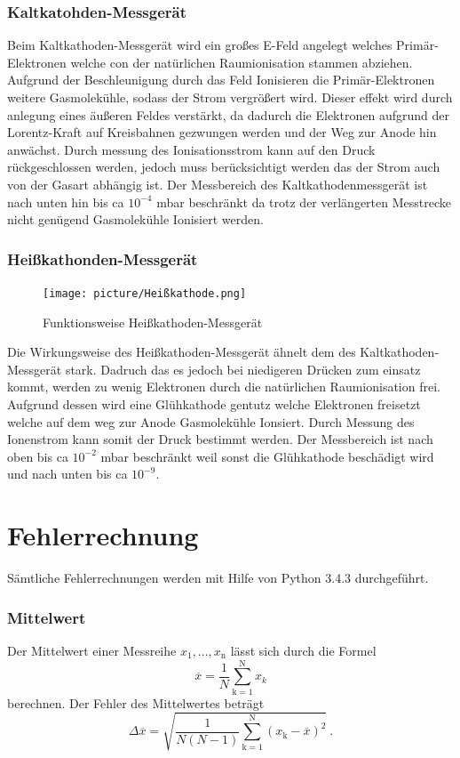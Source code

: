 \subsubsection{Kaltkatohden-Messgerät}
Beim Kaltkathoden-Messgerät wird ein großes E-Feld angelegt welches Primär-Elektronen welche con der natürlichen Raumionisation stammen abziehen. Aufgrund der Beschleunigung durch das Feld Ionisieren die Primär-Elektronen weitere Gasmolekühle, sodass der Strom vergrößert wird. Dieser effekt wird durch anlegung eines äußeren Feldes verstärkt, da dadurch die Elektronen aufgrund der Lorentz-Kraft auf Kreisbahnen gezwungen werden und der Weg zur Anode hin anwächst. Durch messung des Ionisationsstrom kann auf den Druck rückgeschlossen werden, jedoch muss berücksichtigt werden das der Strom auch von der Gasart abhängig ist. Der Messbereich des Kaltkathodenmessgerät ist nach unten hin bis ca $10^{-4}$ mbar beschränkt da trotz der verlängerten Messtrecke nicht genügend Gasmolekühle Ionisiert werden.

\subsubsection{Heißkathonden-Messgerät}
\begin{figure}
  \vspace{-1.0cm}
  \centering
  \texttt{[image: picture/Heißkathode.png]}
  \caption{Funktionsweise Heißkathoden-Messgerät \cite{Heiss}}
  \label{fig:Heißkathode}
  \vspace{-1cm}
\end{figure}
Die Wirkungsweise des Heißkathoden-Messgerät ähnelt dem des Kaltkathoden-Messgerät stark. Dadruch das es jedoch bei niedigeren Drücken zum einsatz kommt, werden zu wenig Elektronen durch die natürlichen Raumionisation frei. Aufgrund dessen wird eine Glühkathode gentutz welche Elektronen freisetzt welche auf dem weg zur Anode Gasmolekühle Ionsiert. Durch Messung des Ionenstrom kann somit der Druck bestimmt werden. Der Messbereich ist nach oben bis ca $10^{-2}$ mbar beschränkt weil sonst die Glühkathode beschädigt wird und nach unten bis ca $10^{-9}$.  
\section{Fehlerrechnung}
Sämtliche Fehlerrechnungen werden mit Hilfe von Python 3.4.3 durchgeführt.
\subsubsection{Mittelwert}
Der Mittelwert einer Messreihe $x_\text{1}, ... ,x_\text{n}$ lässt sich durch die Formel
\begin{equation}
	\overline{x} = \frac{1}{N} \sum_{\text{k}=1}^\text{N} x_k
	\label{eqn:ave}
\end{equation}
berechnen. Der Fehler des Mittelwertes beträgt
\begin{equation}
	\Delta \overline{x} = \sqrt{ \frac{1}{N(N-1)} \sum_{\text{k}=1}^\text{N} (x_\text{k} - \overline{x})^2} \ .
	\label{eqn:std}
\end{equation}

